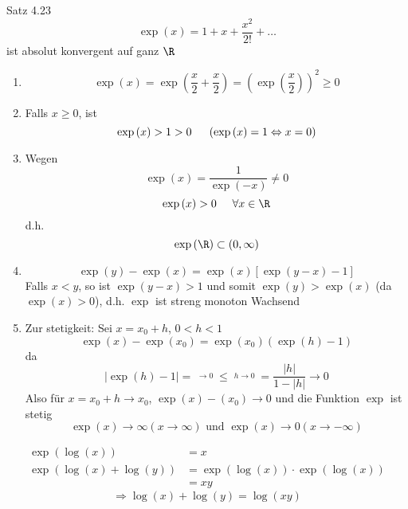 \begin{beweis}{Satz 4.23}
\[\exp \left( x \right) = 1 + x + \frac{{{x^2}}}{{2!}} +  \ldots \]
ist absolut konvergent auf ganz $\R$
\begin{enumerate}
\item \[\exp \left( x \right) = \exp \left( {\frac{x}{2} + \frac{x}{2}} \right) = {\left( {\exp \left( {\frac{x}{2}} \right)} \right)^2} \ge 0\]
\item Falls $x\geq 0$, ist \[\exp \left( x \right) > 1 > 0\hspace{5mm}\left( {\exp \left( x \right) = 1 \Leftrightarrow x = 0} \right)\]
\item Wegen \[\exp \left( x \right) = \frac{1}{{\exp \left( { - x} \right)}}\not  = 0\] \[\exp \left( x \right) > 0\hspace{5mm}\forall x \in \R\] d.h. \[\exp\left( \R\right)\subset\left( 0,\infty\right)\]
\item \[\exp \left( y \right) - \exp \left( x \right) = \exp \left( x \right)\left[ {\exp \left( {y - x} \right) - 1} \right]\]
Falls $x<y$, so ist $\exp\left(y-x\right)>1$ und somit $\exp\left(y\right)>\exp\left(x\right)$ (da $\exp\left(x\right)>0$), d.h. $\exp$ ist streng monoton Wachsend
\item Zur stetigkeit: Sei $x=x_0+h$, $0<h<1$
\[\exp \left( x \right) - \exp \left( {{x_0}} \right) = \exp \left( {{x_0}} \right)\left( {\exp \left( h \right) - 1} \right)\]
da 
\[\left| {\exp \left( h \right) - 1} \right| = \mathop {\left| {\sum\limits_{k = 1}^\infty  {\frac{{{h^k}}}{{k!}}} } \right|}\limits^{ \to 0}  \le \mathop {\left| {\sum\limits_{k = 1}^\infty  {\left| {{h^k}} \right|} } \right|}\limits^{h \to 0}  = \frac{{\left| h \right|}}{{1 - \left| h \right|}} \to 0\]
Also für $x=x_0+h\to x_0$, $\exp\left( x \right)-\left( x_0 \right)\to 0$ und die Funktion $\exp$ ist stetig
\[\exp \left( x \right) \to \infty \left( {x \to \infty } \right){\text{ und }}\exp \left( x \right) \to 0\left( {x \to  - \infty } \right)\]
\end{enumerate}
\end{beweis}

\begin{align*}
\exp\left( \log(x)\right)&=x\\
\exp\left( \log\left(x\right)+\log\left(y\right)\right)&=\exp\left( \log\left(x\right)\right)\cdot\exp\left( \log\left(x\right)\right)\\
&=xy
\end{align*}
\[ \Rightarrow\boxed{\log\left( x\right)+\log\left( y\right)=\log\left( xy\right)}\]

